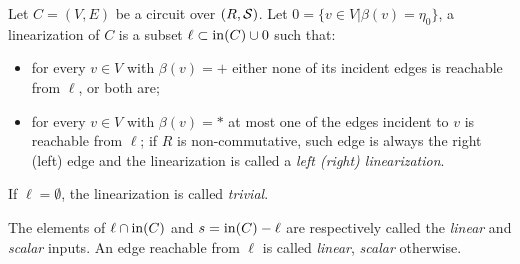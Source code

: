 \begin{definition}[Linearization]
  \label{def:linearization}
  Let $C=(V,E)$ be a circuit over $(R, \mathcal{S})$. Let $0=\{v\in
  V|\beta(v)=\eta_0\}$, a linearization of $C$ is a subset
  $\ell\subset\operatorname{in}(C)\cup 0$ such that:
  \begin{itemize}
  \item for every $v\in V$ with $\beta(v)=+$ either none of its
    incident edges is reachable from $\ell$, or both are;
  \item for every $v\in V$ with $\beta(v)=*$ at most one of the edges
    incident to $v$ is reachable from $\ell$; if $R$ is
    non-commutative, such edge is always the right (left) edge and the
    linearization is called a
    \emph{left
      (right) linearization}.
  \end{itemize}
  If $\ell=\emptyset$, the linearization is called
  \emph{trivial}.

  The elements of $\ell\cap\operatorname{in}(C)$ and $s = \operatorname{in}(C) - \ell$ are
  respectively called the \emph{linear} and
  \emph{scalar} inputs. An edge reachable from
  $\ell$ is called \emph{linear},
  \emph{scalar} otherwise.
\end{definition}


